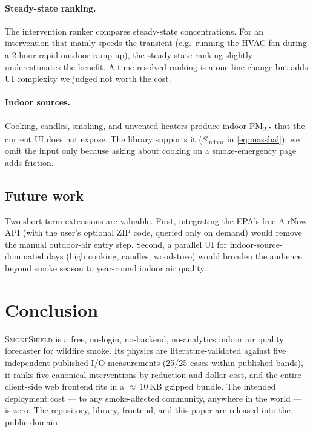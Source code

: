 \documentclass[10pt,twocolumn]{article}
\begin{document}
\paragraph{Steady-state ranking.}  The intervention ranker compares
steady-state concentrations.  For an intervention that mainly speeds
the transient (e.g.\ running the HVAC fan during a 2-hour rapid
outdoor ramp-up), the steady-state ranking slightly underestimates
the benefit.  A time-resolved ranking is a one-line change but adds
UI complexity we judged not worth the cost.

\paragraph{Indoor sources.}  Cooking, candles, smoking, and unvented
heaters produce indoor PM\textsubscript{2.5} that the current UI
does not expose.  The library supports it ($S_{\text{indoor}}$ in
\cref{eq:massbal}); we omit the input only because asking about
cooking on a smoke-emergency page adds friction.

\subsection{Future work}

Two short-term extensions are valuable.  First, integrating the EPA's
free AirNow API (with the user's optional ZIP code, queried only on
demand) would remove the manual outdoor-air entry step.  Second, a
parallel UI for indoor-source-dominated days (high cooking, candles,
woodstove) would broaden the audience beyond smoke season to year-round
indoor air quality.

\section{Conclusion}

\textsc{SmokeShield} is a free, no-login, no-backend, no-analytics
indoor air quality forecaster for wildfire smoke.  Its physics are
literature-validated against five independent published I/O
measurements (25/25 cases within published bands), it ranks five
canonical interventions by reduction and dollar cost, and the entire
client-side web frontend fits in a $\approx$\,10\,KB gzipped bundle.  The intended
deployment cost --- to any smoke-affected community, anywhere in the
world --- is zero.  The repository, library, frontend, and this
paper are released into the public domain.


\end{document}
